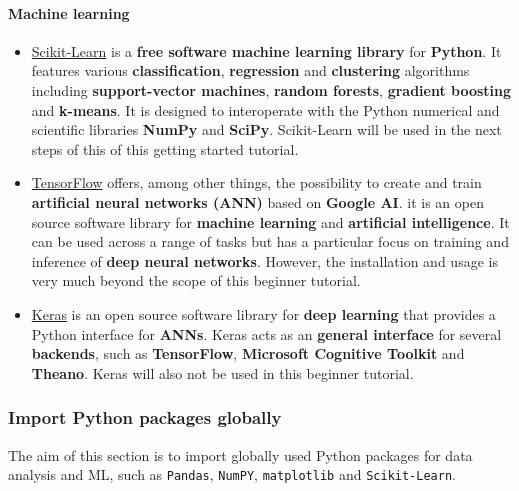 \documentclass [oneside,10pt,a4paper,ngerman,BCOR10mm,headsepline,parindent,final]{scrartcl}
\begin{document}
    \hypertarget{machine-learning}{%
\paragraph{Machine learning}\label{machine-learning}}

\begin{itemize}
\item
  \href{https://scikit-learn.org/stable/}{Scikit-Learn} is a
  \textbf{free software machine learning library} for \textbf{Python}.
  It features various \textbf{classification}, \textbf{regression} and
  \textbf{clustering} algorithms including \textbf{support-vector
  machines}, \textbf{random forests}, \textbf{gradient boosting} and
  \textbf{k-means}. It is designed to interoperate with the Python
  numerical and scientific libraries \textbf{NumPy} and \textbf{SciPy}.
  Scikit-Learn will be used in the next steps of this of this getting
  started tutorial.
\item
  \href{https://www.tensorflow.org}{TensorFlow} offers, among other
  things, the possibility to create and train \textbf{artificial neural
  networks (ANN)} based on \textbf{Google AI}. it is an open source
  software library for \textbf{machine learning} and \textbf{artificial
  intelligence}. It can be used across a range of tasks but has a
  particular focus on training and inference of \textbf{deep neural
  networks}. However, the installation and usage is very much beyond the
  scope of this beginner tutorial.
\item
  \href{https://keras.io/about/}{Keras} is an open source software
  library for \textbf{deep learning} that provides a Python interface
  for \textbf{ANNs}. Keras acts as an \textbf{general interface} for
  several \textbf{backends}, such as \textbf{TensorFlow},
  \textbf{Microsoft Cognitive Toolkit} and \textbf{Theano}. Keras will
  also not be used in this beginner tutorial.
\end{itemize}

    \hypertarget{import-python-packages-globally}{%
\subsubsection{Import Python packages
globally}\label{import-python-packages-globally}}

The aim of this section is to import globally used Python packages for
data analysis and ML, such as \texttt{Pandas}, \texttt{NumPY},
\texttt{matplotlib} and \texttt{Scikit-Learn}.
\end{document}
